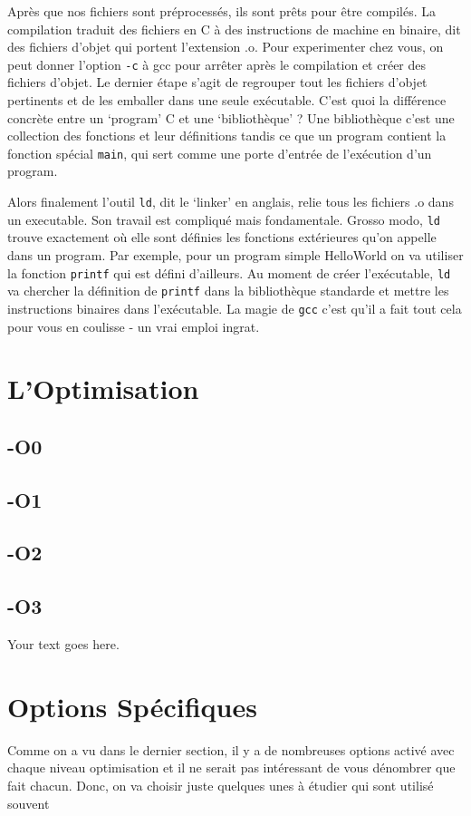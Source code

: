 \documentclass[11pt]{article} %
\begin{document}
Après que nos fichiers sont préprocessés, ils sont prêts pour être compilés. La compilation traduit des fichiers en C à des instructions de machine
en binaire, dit des fichiers d'objet qui portent l'extension .o. Pour experimenter chez vous, on peut donner l'option \verb|-c| à gcc pour arrêter après
le compilation et créer des fichiers d'objet.
    Le dernier étape s'agit de regrouper tout les fichiers d'objet pertinents et de les emballer dans une seule exécutable. C'est quoi la différence concrète entre
un `program' C et une `bibliothèque' ? Une bibliothèque c'est une collection des fonctions et leur définitions tandis ce que un program contient la fonction spécial
\verb|main|, qui sert comme une porte d'entrée de l'exécution d'un program.

    Alors finalement l'outil \verb|ld|, dit le `linker' en anglais, relie tous les fichiers .o dans un executable. Son travail est compliqué mais fondamentale. Grosso modo, \verb|ld|
trouve exactement où elle sont définies les fonctions extérieures qu'on appelle dans un program. Par exemple, pour un program simple HelloWorld on va utiliser la fonction \verb|printf| qui
est défini d'ailleurs. Au moment de créer l'exécutable, \verb|ld| va chercher la définition de \verb|printf| dans la bibliothèque standarde et mettre les instructions binaires dans l'exécutable.
La magie de \verb|gcc| c'est qu'il a fait tout cela pour vous en coulisse - un vrai emploi ingrat.

\section{L'Optimisation}
\subsection{-O0}

\subsection{-O1}
\subsection{-O2}
\subsection{-O3}

Your text goes here.

\section{Options Sp\'ecifiques}
Comme on a vu dans le dernier section, il y a de nombreuses options activ\'e avec chaque niveau optimisation et il ne serait pas int\'eressant
de vous d\'enombrer que fait chacun. Donc, on va choisir juste quelques unes \`a \'etudier qui sont utilis\'e souvent
\end{document}
